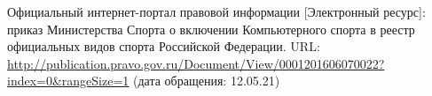 
\begin{thebibliography}{1}
	 Официальный интернет-портал правовой информации [Электронный ресурс]:
	 приказ Министерства Спорта о включении Компьютерного спорта в реестр официальных видов спорта Российской Федерации.
	 URL: \url{http://publication.pravo.gov.ru/Document/View/0001201606070022?index=0&rangeSize=1}
	 (дата обращения: 12.05.21)
	
\end{thebibliography}
